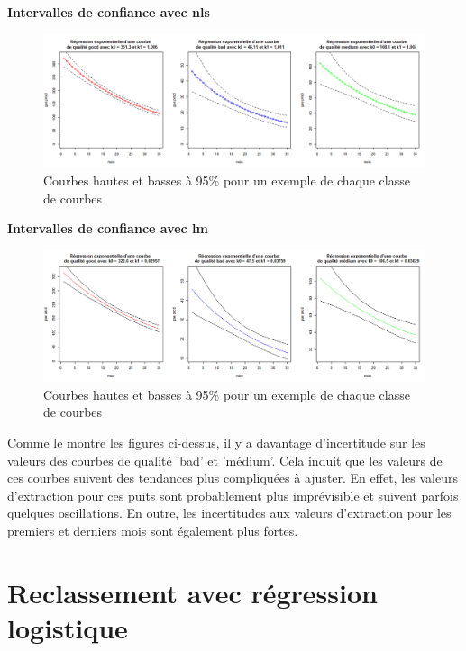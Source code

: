 \documentclass[12pt]{article}
\begin{document}
\textbf{Intervalles de confiance avec nls}

\begin{figure}[H]
 \centering %
	\includegraphics[width=430px]{q3_predict_nls}
  \caption{\label{fig:q3_predict_nls} Courbes hautes et basses à 95\% pour un exemple de chaque classe de courbes}
\end{figure}

\textbf{Intervalles de confiance avec lm}

\begin{figure}[H]
 \centering %
	\includegraphics[width=430px]{q3_predict_lm}
  \caption{\label{fig:q3_predict_lm} Courbes hautes et basses à 95\% pour un exemple de chaque classe de courbes}
\end{figure}

Comme le montre les figures ci-dessus, il y a davantage d'incertitude sur les valeurs des courbes de qualit\'e 'bad' et 'm\'edium'. Cela induit que les valeurs de ces courbes suivent des tendances plus compliqu\'ees à ajuster. En effet, les valeurs d'extraction pour ces puits sont probablement plus impr\'evisible et suivent parfois quelques oscillations. En outre, les incertitudes aux valeurs d'extraction pour les premiers et derniers mois sont \'egalement plus fortes. 


\newpage
\section{Reclassement avec r\'egression logistique}
 
\end{document}
